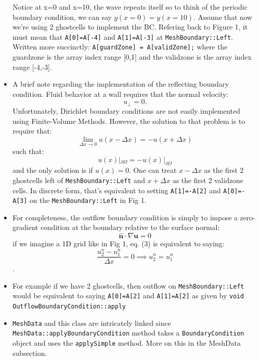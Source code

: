 \documentclass{article}
\begin{document}
\begin{itemize}
	Notice at x=0 and x=10, the wave repeats itself so to think of the periodic boundary condition, we can say $y(x=0)=y(x=10)$. Assume that now we're using 2 ghostcells to implement the BC. Refering back to Figure 1, it must mean that \texttt{A[0]=A[-4]} and \texttt{A[1]=A[-3]} at \texttt{MeshBoundary::Left}. Written more succinctly: \texttt{A[guardZone] = A[validZone];} where the guardzone is the array index range [0,1] and the validzone is the array index range [-4,-3]. 
	
	\item A brief note regarding the implementation of the reflecting boundary condition. Fluid behavior at a wall requires that the normal velocity: 
	\begin{equation}
		u_\perp=0.
	\end{equation}
Unfortunately, Dirichlet boundary conditions are not easily implemented using Finite-Volume Methods. However, the solution to that problem is to require that:
	$$\lim_{\Delta x \rightarrow 0}u(x-\Delta x) = -u(x+\Delta x) $$
	such that: 
	\begin{equation}
		u(x)|_{\partial\Omega} = -u(x)|_{\partial\Omega}
	\end{equation}
and the only solution is if $u(x) = 0$. One can treat $x-\Delta x$ as the first 2 ghostcells left of \texttt{MeshBoundary::Left} and $x+\Delta x$ as the first 2 validzone cells. In discrete form, that's equivalent to setting \texttt{A[1]=-A[2]} and \texttt{A[0]=-A[3]} on the \texttt{MeshBoundary::Left} in Fig 1.
	
	\item For completeness, the outflow boundary condition is simply to impose a zero-gradient condition at the boundary relative to the surface normal:
	\begin{equation}
		\mathbf{\hat{n}} \cdot \nabla \mathbf{u} = 0
	\end{equation}		
if we imagine a 1D grid like in Fig 1, eq. (3) is equivalent to saying:
	$$\frac{u_2^n-u_1^n}{\Delta x} = 0 \implies u_2^n = u_1^n$$.
	\item For example if we have 2 ghostcells, then outflow on \texttt{MeshBoundary::Left} would be equivalent to saying \texttt{A[0]=A[2]} and \texttt{A[1]=A[2]} as given by \texttt{void OutflowBoundaryCondition::apply}
	\item \texttt{MeshData} and this class are intricately linked since \texttt{MeshData::applyBoundaryCondition} method takes a \texttt{BoundaryCondition} object and uses the \texttt{applySimple} method. More on this in the MeshData subsection.
	
	
\end{itemize}
\end{document}
